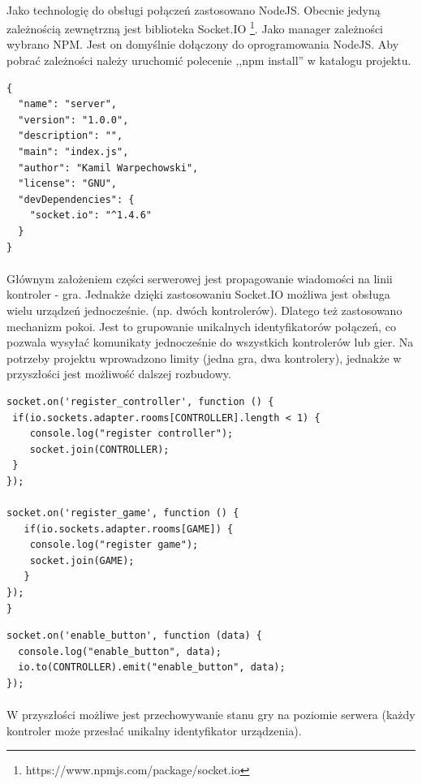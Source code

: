\paragraph{}
Jako technologię do obsługi połączeń zastosowano NodeJS. Obecnie jedyną zależnością zewnętrzną jest biblioteka Socket.IO \footnote{https://www.npmjs.com/package/socket.io}.
Jako manager zależności wybrano NPM. Jest on domyślnie dołączony do oprogramowania NodeJS. Aby pobrać zależności należy uruchomić polecenie ,,npm install'' w katalogu projektu.

\begin{lstlisting}[language=CSharp]
{
  "name": "server",
  "version": "1.0.0",
  "description": "",
  "main": "index.js",
  "author": "Kamil Warpechowski",
  "license": "GNU",
  "devDependencies": {
    "socket.io": "^1.4.6"
  }
}
\end{lstlisting}

\paragraph{}
Głównym założeniem części serwerowej jest propagowanie wiadomości na linii kontroler - gra. Jednakże dzięki zastosowaniu Socket.IO możliwa jest obsługa wielu urządzeń jednocześnie. (np. dwóch kontrolerów). Dlatego też zastosowano mechanizm pokoi. Jest to grupowanie unikalnych identyfikatorów połączeń, co pozwala wysyłać komunikaty jednocześnie do wszystkich kontrolerów lub gier. Na potrzeby projektu wprowadzono limity (jedna gra, dwa kontrolery), jednakże w przyszłości jest możliwość dalszej rozbudowy.

\begin{lstlisting}[language=CSharp]
socket.on('register_controller', function () {
 if(io.sockets.adapter.rooms[CONTROLLER].length < 1) {
	console.log("register controller");
	socket.join(CONTROLLER);
 }
});

socket.on('register_game', function () {
   if(io.sockets.adapter.rooms[GAME]) {
	console.log("register game");
	socket.join(GAME);
   }
});
}
\end{lstlisting}

\begin{lstlisting}[language=CSharp]
socket.on('enable_button', function (data) {
  console.log("enable_button", data);
  io.to(CONTROLLER).emit("enable_button", data);
});
\end{lstlisting}
\paragraph{}
W przyszłości możliwe jest przechowywanie stanu gry na poziomie serwera (każdy kontroler może przesłać unikalny identyfikator urządzenia).